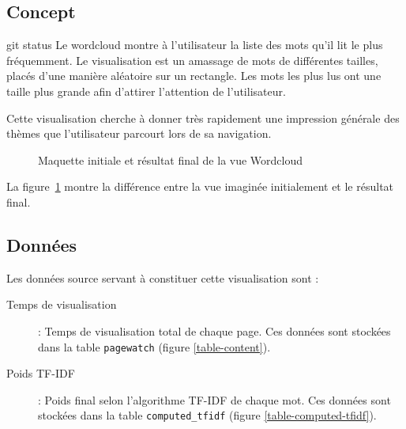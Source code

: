 	\subsection{Concept}
git status
		Le wordcloud montre à l'utilisateur la liste des mots qu'il lit le plus fréquemment. Le visualisation est un amassage de mots de différentes tailles, placés d'une manière aléatoire sur un rectangle. Les mots les plus lus ont une taille plus grande afin d'attirer l'attention de l'utilisateur.

		Cette visualisation cherche à donner très rapidement une impression générale des thèmes que l'utilisateur parcourt lors de sa navigation.

		\begin{figure}[!h]
			\centering
			\caption{Maquette initiale et résultat final de la vue Wordcloud}
			\label{wordcloud_images}
		\end{figure}

		La figure~\ref{wordcloud_images} montre la différence entre la vue imaginée initialement et le résultat final.

	\subsection{Données}

		Les données source servant à constituer cette visualisation sont :
		\begin{description}
			\item[Temps de visualisation] : Temps de visualisation total de chaque page. Ces données sont stockées dans la table \texttt{pagewatch} (figure \ref{table-content}).
			\item[Poids TF-IDF] : Poids final selon l'algorithme TF-IDF de chaque mot. Ces données sont stockées dans la table \texttt{computed\_tfidf} (figure \ref{table-computed-tfidf}).
		\end{description}

